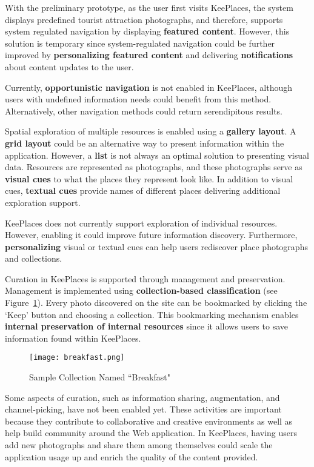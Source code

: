 {With the preliminary prototype, as the user first visits KeePlaces, the system displays predefined tourist attraction photographs, and therefore, supports system regulated navigation by displaying \textbf{featured content}. However, this solution is temporary since system-regulated navigation could be further improved by \textbf{personalizing featured content} and delivering \textbf{notifications} about content updates to the user. 

Currently, \textbf{opportunistic navigation} is not enabled in KeePlaces, although users with undefined information needs could benefit from this method. Alternatively, other navigation methods could return serendipitous results.

Spatial exploration of multiple resources is enabled using a \textbf{gallery layout}. A \textbf{grid layout} could be an alternative way to present information within the application. However, a \textbf{list} is not always an optimal solution to presenting visual data. 
Resources are represented as photographs, and these photographs serve as \textbf{visual cues} to what the places they represent look like. In addition to visual cues, \textbf{textual cues} provide names of different places delivering additional exploration support.

KeePlaces does not currently support exploration of individual resources. However, enabling it could improve future information discovery. Furthermore, \textbf{personalizing} visual or textual cues can help users rediscover place photographs and collections. 

Curation in KeePlaces is supported through management and preservation. Management is implemented using \textbf{collection-based classification} (see Figure~\ref{fig:breakfast}).
Every photo discovered on the site can be bookmarked by clicking the `Keep' button and choosing a collection. This bookmarking mechanism enables \textbf{internal preservation of internal resources} since it allows users to save information found within KeePlaces. 

\begin{figure}[ht!]
	\noindent
	\centering
	\texttt{[image: breakfast.png]}
	\caption{Sample Collection Named ``Breakfast"}
	\label{fig:breakfast} 
\end{figure}

Some aspects of curation, such as information sharing, augmentation, and channel-picking, have not been enabled yet. These activities are important because they contribute to collaborative and creative environments as well as help build community around the Web application. In KeePlaces, having users add new photographs and share them among themselves could scale the application usage up and enrich the quality of the content provided.

}
